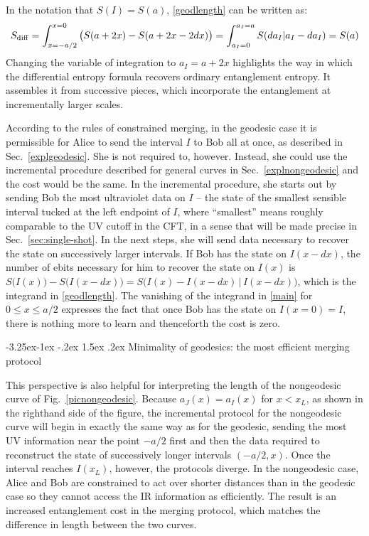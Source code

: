 \documentclass[12pt]{article}
\makeatletter
\renewcommand\subsection{\@startsection{subsection}{2}{\z@}%
                                     {-3.25ex\@plus -1ex \@minus -.2ex}%
                                     {1.5ex \@plus .2ex}%
                                     {\normalfont\bfseries}}
\def\sdiff{S_{\rm diff}}
\newcommand{\figref}[1]{Fig.~\ref{#1}}
\newcommand{\secref}[1]{Sec.~\ref{#1}}
\makeatother
\begin{document}
In the notation that $S(I) = S(a)$, \eqref{geodlength} can be written as:
\begin{equation}
\sdiff = \int_{x = -a/2}^{x=0} \big(S(a+2x) - S(a+2x -2dx) \big)= \int_{a_I = 0}^{a_I = a} S(da_I | a_I - da_I) = S(a)
\label{geodbyscale}
\end{equation}
Changing the variable of integration to $a_I = a+2x$ highlights the way in which the differential entropy formula recovers ordinary entanglement entropy. It assembles it from successive pieces, which incorporate the entanglement at incrementally larger scales.

According to the rules of constrained merging, in the geodesic case it is permissible for Alice to send the interval $I$ to Bob all at once, as described in Sec.~\ref{explgeodesic}. She is not required to, however. Instead, she could use the incremental procedure described for general curves in Sec.~\ref{explnongeodesic} and the cost would be the same.
%
In the incremental procedure, she starts out by sending Bob the most ultraviolet data on $I$ -- the state of the smallest sensible interval tucked at the left endpoint of $I$, where ``smallest'' means roughly comparable to the UV cutoff in the CFT, in a sense that will be made precise in \secref{sec:single-shot}. In the next steps, she will send data necessary to recover the state on successively larger intervals. If Bob has the state on $I(x-dx)$, the number of ebits necessary for him to recover the state on $I(x)$ is $S\big(I(x)\big) - S\big(I(x-dx)\big) = S\big(I(x) - I(x-dx) \, | \, I(x-dx)\big)$, which is the integrand in \eqref{geodlength}.  The vanishing of the integrand in \eqref{main} for $0 \leq x \leq a/2$ expresses the fact that once Bob has the state on $I(x=0) = I$, there is nothing more to learn and thenceforth the cost is zero.

\subsection{Minimality of geodesics: the most efficient merging protocol}
\label{min-geodesic}

This perspective is also helpful for interpreting the length of the nongeodesic curve of \figref{picnongeodesic}. Because $a_J(x) = a_I(x)$ for $x < x_L$, as shown in the righthand side of the figure, the incremental protocol for the nongeodesic curve will begin in exactly the same way as for the geodesic, sending the most UV information near the point $-a/2$ first and then the data required to reconstruct the state of successively longer intervals $(-a/2,x)$. Once the interval reaches $I(x_L)$, however, the protocols diverge. In the nongeodesic case, Alice and Bob are constrained to act over shorter distances than in the geodesic case so they cannot access the IR information as efficiently. The result is an increased entanglement cost in the merging protocol, which matches the difference in length between the two curves.
\end{document}
